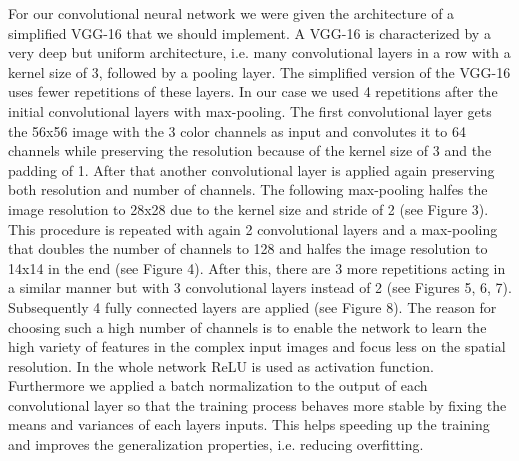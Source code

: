 \documentclass{tubaf-article}
\begin{document}
	For our convolutional neural network we were given the architecture of a simplified VGG-16 that we should implement. A VGG-16 is characterized by a very deep but uniform architecture, i.e. many convolutional layers in a row with a kernel size of 3, followed by a pooling layer. The simplified version of the VGG-16 uses fewer repetitions of these layers. In our case we used 4 repetitions after the initial convolutional layers with max-pooling. The first convolutional layer gets the 56x56 image with the 3 color channels as input and convolutes it to 64 channels while preserving the resolution because of the kernel size of 3 and the padding of 1. After that another convolutional layer is applied again preserving both resolution and number of channels. The following max-pooling halfes the image resolution to 28x28 due to the kernel size and stride of 2 (see Figure 3). This procedure is repeated with again 2 convolutional layers and a max-pooling that doubles the number of channels to 128 and halfes the image resolution to 14x14 in the end (see Figure 4). After this, there are 3 more repetitions acting in a similar manner but with 3 convolutional layers instead of 2 (see Figures 5, 6, 7). Subsequently 4 fully connected layers are applied (see Figure 8). The reason for choosing such a high number of channels is to enable the network to learn the high variety of features in the complex input images and focus less on the spatial resolution. In the whole network ReLU is used as activation function. Furthermore we applied a batch normalization to the output of each convolutional layer so that the training process behaves more stable by fixing the means and variances of each layers inputs. This helps speeding up the training and improves the generalization properties, i.e. reducing overfitting.
	
\end{document}
